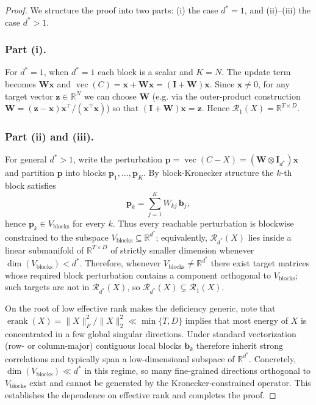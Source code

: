 \documentclass[10pt,a4paper]{amsart}
\begin{document}
\begin{proof}
We structure the proof into two parts: (i) the case $d^{\ast}=1$, and (ii)–(iii) the case $d^{\ast}>1$. 
\subsubsection*{\bf Part (i).} For $d^{\ast}=1$, when \(d^{\ast}=1\) each block is a scalar and \(K=N\). The update term becomes \(\mathbf W\mathbf x\) and \(\operatorname{vec}(C)=\mathbf x+\mathbf W\mathbf x=(\mathbf I+\mathbf W)\mathbf x\). Since \(\mathbf x\neq 0\), for any target vector \(\mathbf z\in\mathbb R^N\) we can choose \(\mathbf W\) (e.g. via the outer-product construction \(\mathbf W=(\mathbf z-\mathbf x)\mathbf x^\top/(\mathbf x^\top\mathbf x)\)) so that \((\mathbf I+\mathbf W)\mathbf x=\mathbf z\). Hence \(\mathcal R_1(X)=\mathbb R^{T\times D}\).

\subsubsection*{\bf Part (ii) and (iii).} For general \(d^{\ast}>1\), write the perturbation \(\mathbf p=\operatorname{vec}(C-X)=(\mathbf W\otimes\mathbf I_{d^{\ast}})\mathbf x\) and partition \(\mathbf p\) into blocks \(\mathbf p_1,\dots,\mathbf p_K\). By block-Kronecker structure the \(k\)-th block satisfies
\[
\mathbf p_k=\sum_{j=1}^K W_{kj}\,\mathbf b_j,
\]
hence \(\mathbf p_k\in V_{\mathrm{blocks}}\) for every \(k\). Thus every reachable perturbation is blockwise constrained to the subspace \(V_{\mathrm{blocks}}\subseteq\mathbb R^{d^{\ast}}\); equivalently, \(\mathcal R_{d^{\ast}}(X)\) lies inside a linear submanifold of \(\mathbb R^{T\times D}\) of strictly smaller dimension whenever \(\dim(V_{\mathrm{blocks}})<d^{\ast}\). Therefore, whenever \(V_{\mathrm{blocks}}\neq\mathbb R^{d^{\ast}}\) there exist target matrices whose required block perturbation contains a component orthogonal to \(V_{\mathrm{blocks}}\); such targets are not in \(\mathcal R_{d^{\ast}}(X)\), so \(\mathcal R_{d^{\ast}}(X)\subsetneq\mathcal R_1(X)\).

On the root of low effective rank makes the deficiency generic, note that \(\operatorname{erank}(X)=\|X\|_F^2/\|X\|_2^2\ll\min\{T,D\}\) implies that most energy of \(X\) is concentrated in a few global singular directions. Under standard vectorization (row- or column-major) contiguous local blocks \(\mathbf b_k\) therefore inherit strong correlations and typically span a low-dimensional subspace of \(\mathbb R^{d^{\ast}}\). Concretely, \(\dim(V_{\mathrm{blocks}})\ll d^{\ast}\) in this regime, so many fine-grained directions orthogonal to \(V_{\mathrm{blocks}}\) exist and cannot be generated by the Kronecker-constrained operator. This establishes the dependence on effective rank and completes the proof.
\end{proof}
\end{document}
